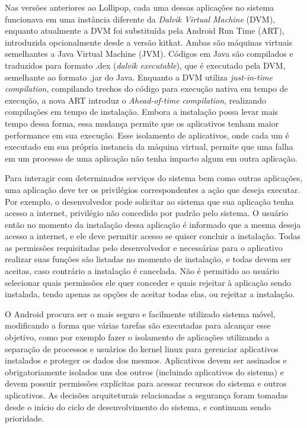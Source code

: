 Nas versões anteriores ao Lollipop, cada uma dessas aplicações no sistema funcionava em uma instância diferente da \textit{Dalvik Virtual Machine} (DVM), enquanto atualmente a DVM foi substituída pela Android Run Time (ART), introduzida opcionalmente desde a versão kitkat. Ambas são máquinas virtuais semelhantes a Java Virtual Machine (JVM). Códigos em Java são compilados e traduzidos para formato .dex (\textit{dalvik executable}), que é executado pela DVM, semelhante ao formato .jar do Java. Enquanto a DVM utiliza \textit{just-in-time compilation}, compilando trechos do código para execução nativa em tempo de execução, a nova ART introduz o \textit{Ahead-of-time compilation}, realizando compilações em tempo de instalação. Embora a instalação possa levar mais tempo dessa forma, essa mudança permite que os aplicativos tenham maior performance em sua execução. Esse isolamento de aplicativos, onde cada um é executado em sua própria instancia da máquina virtual, permite que uma falha em um processo de uma aplicação não tenha impacto algum em outra aplicação.  

Para interagir com determinados serviços do sistema bem como outras aplicações, uma aplicação deve ter os privilégios correspondentes a ação que deseja executar. Por exemplo, o desenvolvedor pode solicitar ao sistema que sua aplicação tenha acesso a internet, privilégio não concedido por padrão pelo sistema. O usuário então no momento da instalação dessa aplicação é informado que a mesma deseja acesso a internet, e ele deve permitir acesso se quiser concluir a instalação. Todas as permissões requisitadas pelo desenvolvedor e necessárias para o aplicativo realizar suas funções são listadas no momento de instalação, e todas devem ser aceitas, caso contrário a instalação é cancelada. Não é permitido ao usuário selecionar quais permissões ele quer conceder e quais rejeitar à aplicação sendo instalada, tendo apenas as opções de aceitar todas elas, ou rejeitar a instalação.

O Android procura ser o mais seguro e facilmente utilizado sistema móvel, modificando a forma que várias tarefas são executadas para alcançar esse objetivo, como por exemplo fazer o isolamento de aplicações utilizando a separação de processos e usuários do kernel linux para gerenciar aplicativos instalados e proteger os dados dos mesmos. Aplicativos devem ser assinados e obrigatoriamente isolados uns dos outros (incluindo aplicativos do sistema) e devem possuir permissões explícitas para acessar recursos do sistema e outros aplicativos. As decisões arquiteturais relacionadas a segurança foram tomadas desde o início do ciclo de desenvolvimento do sistema, e continuam sendo prioridade.

